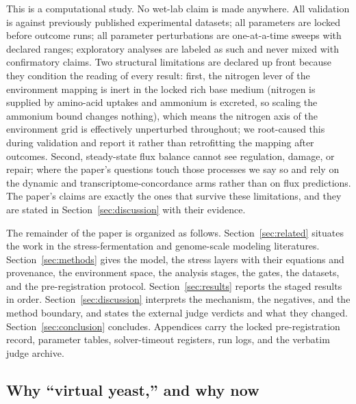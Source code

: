 \documentclass[12pt]{article}
\begin{document}
This is a computational study. No wet-lab claim is made anywhere. All
validation is against previously published experimental datasets; all
parameters are locked before outcome runs; all parameter perturbations
are one-at-a-time sweeps with declared ranges; exploratory analyses are
labeled as such and never mixed with confirmatory claims. Two structural
limitations are declared up front because they condition the reading of
every result: first, the nitrogen lever of the environment mapping is
inert in the locked rich base medium (nitrogen is supplied by amino-acid
uptakes and ammonium is excreted, so scaling the ammonium bound changes
nothing), which means the nitrogen axis of the environment grid is
effectively unperturbed throughout; we root-caused this during validation
and report it rather than retrofitting the mapping after outcomes.
Second, steady-state flux balance cannot see regulation, damage, or
repair; where the paper's questions touch those processes we say so and
rely on the dynamic and transcriptome-concordance arms rather than on
flux predictions. The paper's claims are exactly the ones that survive
these limitations, and they are stated in Section~\ref{sec:discussion}
with their evidence.

The remainder of the paper is organized as follows.
Section~\ref{sec:related} situates the work in the stress-fermentation
and genome-scale modeling literatures. Section~\ref{sec:methods} gives
the model, the stress layers with their equations and provenance, the
environment space, the analysis stages, the gates, the datasets, and the
pre-registration protocol. Section~\ref{sec:results} reports the staged
results in order. Section~\ref{sec:discussion} interprets the mechanism,
the negatives, and the method boundary, and states the external judge
verdicts and what they changed. Section~\ref{sec:conclusion} concludes.
Appendices carry the locked pre-registration record, parameter tables,
solver-timeout registers, run logs, and the verbatim judge archive.




\subsection{Why ``virtual yeast,'' and why now}
\end{document}
